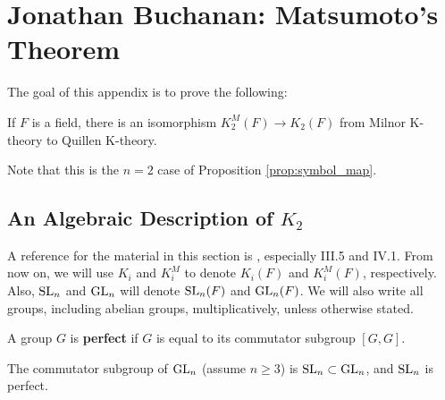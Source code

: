 \def\St{\mathrm{St}}

\section{Jonathan Buchanan: Matsumoto's Theorem}
The goal of this appendix is to prove the following:
\begin{theorem}
    \label{thm:matsumoto}
    If $F$ is a field, there is an isomorphism $K_2^M(F) \to K_2(F)$ from Milnor K-theory to Quillen K-theory.
\end{theorem}
Note that this is the $n = 2$ case of Proposition \ref{prop:symbol_map}.

\subsection{An Algebraic Description of $K_2$}
A reference for the material in this section is \cite{Kbook}, especially III.5 and IV.1. From now on, we will use $K_i$ and $K_i^M$ to denote $K_i(F)$ and $K_i^M(F)$, respectively. Also, $\mathrm{SL}_n$ and $\mathrm{GL}_n$ will denote $\mathrm{SL}_n(F)$ and $\mathrm{GL}_n(F)$. We will also write all groups, including abelian groups, multiplicatively, unless otherwise stated.

\begin{definition}
    A group $G$ is \textbf{perfect} if $G$ is equal to its commutator subgroup $[G, G]$.
\end{definition}
\begin{example}
    The commutator subgroup of $\mathrm{GL}_n$ (assume $n \geq 3$) is $\mathrm{SL}_n \subset \mathrm{GL}_n$, and $\mathrm{SL}_n$ is perfect.
\end{example}

